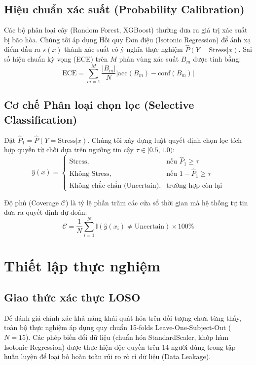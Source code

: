 \documentclass[conference]{IEEEtran}
\begin{document}
\subsection{Hiệu chuẩn xác suất (Probability Calibration)}
Các bộ phân loại cây (Random Forest, XGBoost) thường đưa ra giá trị xác suất bị bão hòa. Chúng tôi áp dụng Hồi quy Đơn điệu (Isotonic Regression) để ánh xạ điểm đầu ra $s(x)$ thành xác suất có ý nghĩa thực nghiệm $\hat{P}(Y=\text{Stress}|x)$. Sai số hiệu chuẩn kỳ vọng (ECE) trên $M$ phân vùng xác suất $B_m$ được tính bằng:
\begin{equation}
\text{ECE} = \sum_{m=1}^M \frac{|B_m|}{N} \left| \text{acc}(B_m) - \text{conf}(B_m) \right|
\end{equation}

\subsection{Cơ chế Phân loại chọn lọc (Selective Classification)}
Đặt $\hat{P}_1 = \hat{P}(Y=\text{Stress}|x)$. Chúng tôi xây dựng luật quyết định chọn lọc tích hợp quyền từ chối dựa trên ngưỡng tin cậy $\tau \in [0.5, 1.0)$:
\begin{equation}
\hat{y}(x) = 
\begin{cases} 
\text{Stress}, & \text{nếu } \hat{P}_1 \ge \tau \\
\text{Không Stress}, & \text{nếu } 1 - \hat{P}_1 \ge \tau \\
\text{Không chắc chắn (Uncertain)}, & \text{trường hợp còn lại}
\end{cases}
\end{equation}

Độ phủ (Coverage $\mathcal{C}$) là tỷ lệ phần trăm các cửa sổ thời gian mà hệ thống tự tin đưa ra quyết định dự đoán:
\begin{equation}
\mathcal{C} = \frac{1}{N} \sum_{i=1}^N \mathbb{I}(\hat{y}(x_i) \neq \text{Uncertain}) \times 100\%
\end{equation}

\section{Thiết lập thực nghiệm}

\subsection{Giao thức xác thực LOSO}
Để đánh giá chính xác khả năng khái quát hóa trên đối tượng chưa từng thấy, toàn bộ thực nghiệm áp dụng quy chuẩn 15-folds Leave-One-Subject-Out ($N=15$). Các phép biến đổi dữ liệu (chuẩn hóa StandardScaler, khớp hàm Isotonic Regression) được thực hiện độc quyền trên 14 người dùng trong tập huấn luyện để loại bỏ hoàn toàn rủi ro rò rỉ dữ liệu (Data Leakage).
\end{document}
